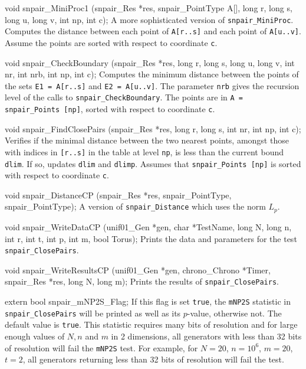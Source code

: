 void snpair_MiniProc1 (snpair_Res *res, snpair_PointType A[], long r, long s,
                       long u, long v, int np, int c);
\endcode
 \tab A more sophisticated version of {\tt snpair\_MiniProc}.
 Computes the distance between each point of {\tt A[r..s]} and each point
  of {\tt A[u..v]}. Assume the points are sorted with respect to
  coordinate {\tt c}.
\endtab
\code


void snpair_CheckBoundary (snpair_Res *res, long r, long s, long u, long v,
                           int nr, int nrb, int np, int c);
\endcode
 \tab  Computes the minimum distance between the  points of the sets
   {\tt E1 = A[r..s]} and {\tt E2 = A[u..v]}.
   The parameter {\tt nrb} gives the recursion level of the calls
   to {\tt snpair\_CheckBoundary}.
   The  points are in {\tt A = snpair\_Points [np]}, sorted with respect to
   coordinate {\tt c}.
 \endtab
\code


void snpair_FindClosePairs (snpair_Res *res, long r, long s, int nr,
                            int np, int c);
\endcode
 \tab Verifies if the minimal distance between the two nearest points,
   amongst those with indices in {\tt [r..s]} in the table at level
   {\tt np}, is less than the current bound {\tt dlim}. If so,
   updates {\tt dlim} and {\tt dlimp}.
   Assumes that {\tt snpair\_Points [np]} is sorted with respect to
   coordinate {\tt c}.
 \endtab
\endhide


\ifdetailed
{} %
\else                          %

\resdef
\fi  %

\hide %
\code

void snpair_DistanceCP (snpair_Res *res, snpair_PointType, snpair_PointType);
\endcode
 \tab A version of {\tt snpair\_Distance} which uses the norm $L_p$.
 \endtab
\endhide %
\ifdetailed %
\code


void snpair_WriteDataCP (unif01_Gen *gen, char *TestName, long N, long n,
                         int r, int t, int p, int m, bool Torus);
\endcode
 \tab Prints the data and parameters for the test {\tt snpair\_ClosePairs}.
 \endtab
\code


void snpair_WriteResultsCP (unif01_Gen *gen, chrono_Chrono *Timer,
                            snpair_Res *res, long N, long m);
\endcode
 \tab Prints the results of {\tt snpair\_ClosePairs}.
 \endtab
\fi %
\code


extern bool snpair_mNP2S_Flag;
\endcode
 \tab If this flag is set {\tt true}, the {\tt mNP2S} statistic in
 {\tt snpair\_ClosePairs} will be printed as well as its $p$-value, otherwise not.
  The default value is {\tt true}.
 This statistic requires many bits of resolution and for large enough values of
  $N, n$ and $m$ in 2 dimensions, all generators with less than 32 bits of
  resolution will fail the {\tt mNP2S} test.
  For example, for $N=20$, $n=10^6$, $m=20$, $t=2$, all generators returning
  less than 32  bits of resolution will fail the test. \endtab
\code


